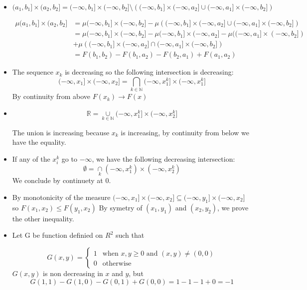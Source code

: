 \documentclass[12pt]{article}
\newcommand{\union}[1]{\underset{#1}{\cup} }
\newcommand{\inter}[1]{\underset{#1}{\cap} }
\newcommand{\biginter}[1]{\underset{#1}{\bigcap} }
\begin{document}
\begin{itemize}
\item
$$(a_1, b_1] \times (a_2, b_2] = (-\infty, b_1] \times (-\infty, b_2]
 \setminus 
\left( (-\infty, b_1] \times (-\infty, a_2] 
 \union{} (-\infty, a_1] \times (-\infty, b_2] \right)$$ 


\begin{align*}
\mu (a_1, b_1] \times (a_2, b_2] 
&= \mu (-\infty, b_1] \times (-\infty, b_2]
 -
\mu \left( (-\infty, b_1] \times (-\infty, a_2] 
 \union{} (-\infty, a_1] \times (-\infty, b_2] \right)\\
&= \mu (-\infty, b_1] \times (-\infty, b_2] 
-\mu  (-\infty, b_1] \times (-\infty, a_2] 
- \mu ((-\infty, a_1] \times (-\infty, b_2]) \\
&+ \mu \left( (-\infty, b_1] \times (-\infty, a_2] 
 \inter{} (-\infty, a_1] \times (-\infty, b_2] \right) \\
&= F(b_1, b_2) - F(b_1, a_2) - F(b_2, a_1) + F(a_1, a_2)
\end{align*}

\item
The sequence $x_k$ is decreasing so the following intersection is decreasing:
$$(-\infty, x_1] \times (-\infty, x_2] = \biginter{k \in \mathbb{N}} (-\infty, x^k_1] \times (-\infty, x^k_1]$$
By continuity from above $F(x_k) \rightarrow F(x)$

\item

$$\mathbb{R} = \union{k \in \mathbb{N}} (-\infty, x_1^k] \times (-\infty, x_2^k]$$

The union is increasing because $x_{k}$ is increasing, by continuity from below we have the equality.


\item If any of the $x_i^k$ go to $-\infty$, we have the following decreasing intersection:
$$\emptyset = \inter{k} (-\infty, x^k_1) \times (-\infty, x^k_2) $$
We conclude by continuety at 0.


\item By monotonicity of the measure $(-\infty, x_1] \times (-\infty, x_2] \subseteq (-\infty, y_1] \times (-\infty, x_2] $ so $F(x_1, x_2) \leq F(y_1, x_2)$
By symetry of $(x_1, y_1)$ and $(x_2, y_2)$, we prove the other inequality.

\item Let G be function definied on $R^2$ such that 

\[ 
G(x,y) = \left\{
\begin{array}{cc}
    1 & \text{when $x, y \geq 0$ and $(x, y) \neq (0,0)$} \\
      0 & \text{otherwise}
  \end{array}
  \right.
\]
$G(x,y)$ is non decreasing in $x$ and $y$, but
$$G(1, 1) - G(1, 0) - G(0, 1) + G(0, 0) = 1 - 1 - 1 + 0 = -1$$

\end{itemize}
\end{document}
